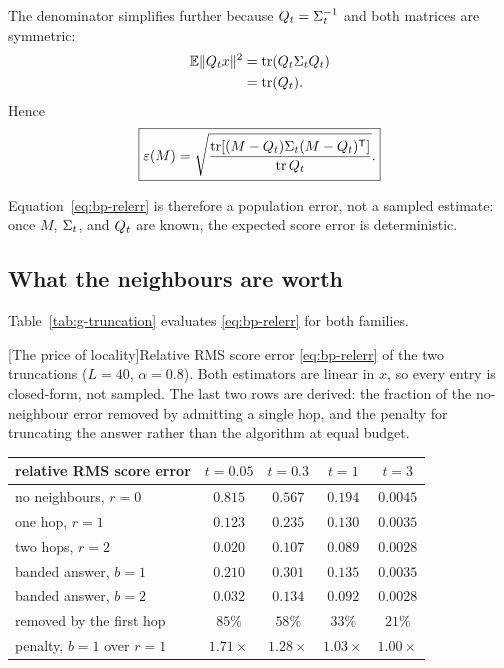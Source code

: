 The denominator simplifies further because
$Q_t=\Sigma_t^{-1}$ and both matrices are symmetric:
\begin{align}
  \mathbb{E}\|Q_t x\|^2
  &=
  \operatorname{tr}(Q_t\Sigma_tQ_t) \\
  &=
  \operatorname{tr}(Q_t).
  \label{eq:bp-error-denominator}
\end{align}
Hence
\begin{equation}
  \boxed{
  \varepsilon(M)
  =
  \sqrt{
    \frac{
      \operatorname{tr}\!\left[
        (M-Q_t)\Sigma_t(M-Q_t)^{\mathsf{T}}
      \right]
    }{
      \operatorname{tr}Q_t
    }
  }.
  }
  \label{eq:bp-relerr}
\end{equation}

Equation~\eqref{eq:bp-relerr} is therefore a population error, not a
sampled estimate: once $M$, $\Sigma_t$, and $Q_t$ are known, the expected score
error is deterministic.


\subsection{What the neighbours are worth}

Table~\ref{tab:g-truncation} evaluates \eqref{eq:bp-relerr} for both families.

\begin{center}
\begin{minipage}{\linewidth}\centering
{}[The price of locality]{Relative RMS score error
\eqref{eq:bp-relerr} of the two truncations ($L = 40$, $\alpha = 0.8$). Both
estimators are linear in $x$, so every entry is closed-form, not sampled. The
last two rows are derived: the fraction of the no-neighbour error removed by
admitting a single hop, and the penalty for truncating the answer rather than
the algorithm at equal budget.}
\label{tab:g-truncation}
\begin{tabular}{@{}lcccc@{}}
\toprule
relative RMS score error & $t = 0.05$ & $t = 0.3$ & $t = 1$ & $t = 3$ \\
\midrule
no neighbours, $r = 0$        & $0.815$ & $0.567$ & $0.194$ & $0.0045$ \\
one hop, $r = 1$              & $0.123$ & $0.235$ & $0.130$ & $0.0035$ \\
two hops, $r = 2$             & $0.020$ & $0.107$ & $0.089$ & $0.0028$ \\
\addlinespace
banded answer, $b = 1$        & $0.210$ & $0.301$ & $0.135$ & $0.0035$ \\
banded answer, $b = 2$        & $0.032$ & $0.134$ & $0.092$ & $0.0028$ \\
\midrule
removed by the first hop      & $85\%$  & $58\%$  & $33\%$  & $21\%$ \\
penalty, $b{=}1$ over $r{=}1$ & $1.71\times$ & $1.28\times$ & $1.03\times$ & $1.00\times$ \\
\bottomrule
\end{tabular}
\end{minipage}
\end{center}

